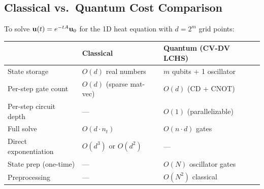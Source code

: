 \documentclass[11pt]{article}
\begin{document}
\subsection{Classical vs.\ Quantum Cost Comparison}

To solve $\vb{u}(t) = e^{-tA}\vb{u}_0$ for the 1D heat equation with
$d = 2^m$ grid points:
\begin{center}
\begin{tabular}{lll}
  \toprule
  & Classical & Quantum (CV-DV LCHS) \\
  \midrule
  State storage & $O(d)$ real numbers & $m$ qubits + 1 oscillator \\
  Per-step gate count & $O(d)$ (sparse mat-vec) & $O(d)$ (CD + CNOT) \\
  Per-step circuit depth & --- & $O(1)$ (parallelizable) \\
  Full solve & $O(d \cdot n_t)$ & $O(n \cdot d)$ gates \\
  Direct exponentiation & $O(d^3)$ or $O(d^2)$ & --- \\
  State prep (one-time) & --- & $O(N)$ oscillator gates \\
  Preprocessing & --- & $O(N^2)$ classical \\
  \bottomrule
\end{tabular}
\end{center}
\end{document}
